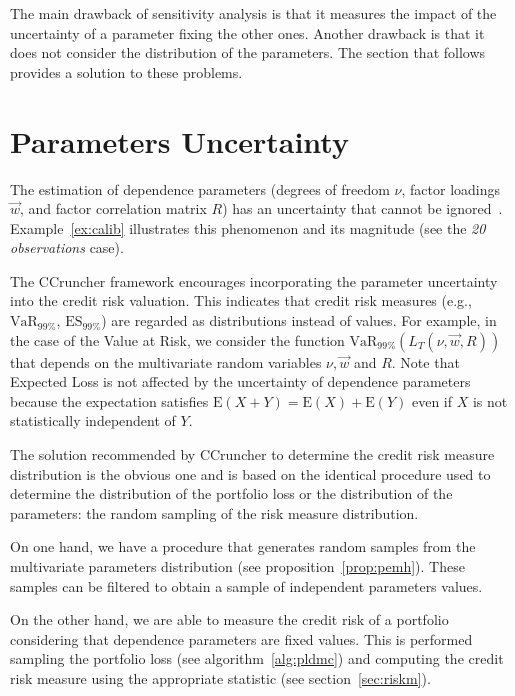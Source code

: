 \documentclass[11pt,fleqn]{book} %
\begin{document}
The main drawback of sensitivity analysis is that it measures the impact 
of the uncertainty of a parameter fixing the other ones. Another drawback 
is that it does not consider the distribution of the parameters. The 
section that follows provides a solution to these problems.

\section{Parameters Uncertainty}

The estimation of dependence parameters (degrees of freedom $\nu$, factor
loadings $\vec{w}$, and factor correlation matrix $R$) has an uncertainty 
that cannot be ignored~\cite{tarashev:2010,gossl:2005}. Example~\ref{ex:calib} 
illustrates this phenomenon and its magnitude (see the \emph{20 observations} 
case).

The CCruncher framework encourages incorporating the parameter uncertainty 
into the credit risk valuation. This indicates that credit risk measures
(e.g., $\text{VaR}_{99\%}$, $\text{ES}_{99\%}$) are regarded as distributions 
instead of values. For example, in the case of the Value at Risk, we consider
the function $\text{VaR}_{99\%}(L_T(\nu,\vec{w},R))$ that depends on 
the multivariate random variables $\nu, \vec{w}$ and $R$. Note that Expected 
Loss is not affected by the uncertainty of dependence parameters because the 
expectation satisfies $\text{E}(X+Y)=\text{E}(X)+\text{E}(Y)$ even if $X$ is 
not statistically independent of $Y$.

The solution recommended by CCruncher to determine the credit risk measure 
distribution is the obvious one and is based on the identical procedure 
used to determine the distribution of the portfolio loss or the distribution 
of the parameters: the random sampling of the risk measure distribution. 

On one hand, we have a procedure that generates random samples from the 
multivariate parameters distribution (see proposition~\ref{prop:pemh}).
These samples can be filtered to obtain a sample of independent parameters 
values.

On the other hand, we are able to measure the credit risk of a portfolio 
considering that dependence parameters are fixed values. This is performed 
sampling the portfolio loss (see algorithm~\ref{alg:pldmc}) and computing 
the credit risk measure using the appropriate statistic (see 
section~\ref{sec:riskm}).
\end{document}
